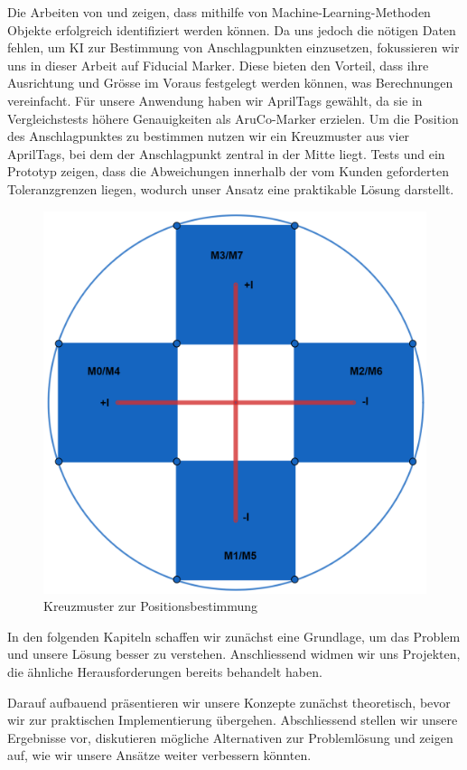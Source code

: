 Die Arbeiten von \cite{yong_object_2023} und \cite{zhou_image-based_2021} zeigen, dass mithilfe von Machine-Learning-Methoden Objekte erfolgreich identifiziert werden können.
Da uns jedoch die nötigen Daten fehlen, um KI zur Bestimmung von Anschlagpunkten einzusetzen, fokussieren wir uns in dieser Arbeit auf Fiducial Marker. Diese bieten den Vorteil, 
dass ihre Ausrichtung und Grösse im Voraus festgelegt werden können, was Berechnungen vereinfacht. Für unsere Anwendung haben wir AprilTags gewählt, da sie in Vergleichstests höhere 
Genauigkeiten als AruCo-Marker erzielen. Um die Position des Anschlagpunktes zu bestimmen nutzen wir ein Kreuzmuster aus vier AprilTags, bei dem der Anschlagpunkt zentral in der Mitte liegt.
Tests und ein Prototyp zeigen, dass die Abweichungen innerhalb der vom Kunden geforderten Toleranzgrenzen liegen, wodurch unser Ansatz eine praktikable Lösung darstellt.

\begin{figure}[H]
    \centering
    \includegraphics[width=0.5\linewidth]{graphics/marker_anordnung.png}
    \caption{Kreuzmuster zur Positionsbestimmung}
\end{figure}


In den folgenden Kapiteln schaffen wir zunächst eine Grundlage, um das Problem und unsere Lösung besser zu verstehen. Anschliessend 
widmen wir uns Projekten, die ähnliche Herausforderungen bereits behandelt haben.

Darauf aufbauend präsentieren wir unsere Konzepte zunächst theoretisch, bevor wir zur praktischen Implementierung 
übergehen. Abschliessend stellen wir unsere Ergebnisse vor, diskutieren mögliche Alternativen zur Problemlösung und 
zeigen auf, wie wir unsere Ansätze weiter verbessern könnten.


